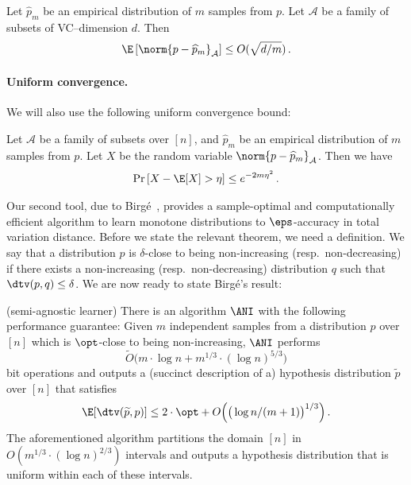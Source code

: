 \begin{theorem}
\label{thm:vc-inequality}
Let $\widehat{p}_m$ be an empirical distribution of $m$ samples from $p$.
Let $\mathcal A$ be a family of subsets of VC--dimension $d$.
Then
$$ \E \left [ \norm{p - \widehat{p}_m}_{\mathcal A} \right] \leq O(\sqrt{d/m}) \,.$$
\end{theorem}

\paragraph{Uniform convergence.}
We will also use the following uniform convergence bound:
%
\begin{theorem}[{\cite[p.17]{DL:01}}]
\label{thm:bdd-diff}
Let $\mathcal A$ be a family of subsets over $[n]$, and $\widehat{p}_m$ be an
empirical distribution of $m$ samples from $p$.
Let $X$ be the random variable $\norm{p - \widehat{p}_{m}}_{\mathcal A}$.
Then we have
$$ \Pr\left[ X - \E[X] > \eta \right] \leq e^{-2m\eta^2}\,.$$
\end{theorem}

Our second tool, due to Birg\'{e}~\cite{Birge:87b},
provides a sample-optimal and computationally efficient algorithm
to learn monotone distributions to $\eps$-accuracy in total variation distance.
Before we state the relevant theorem, we need a definition.
We say that a distribution $p$ is $\delta$-close to being non-increasing (resp.\ non-decreasing)
if there exists a non-increasing (resp.\ non-decreasing) distribution $q$ such that
$\dtv(p,q)\leq \delta$. We are now ready to state  Birg\'{e}'s result:


\begin{theorem} \label{thm:birge-monotone}
(semi-agnostic learner) \label{thm:agnostic-monotone-learner}
There is an algorithm $\ANI$ with the following performance guarantee: Given
$m$ independent samples from a distribution $p$  over $[n]$ which is $\opt$-close to being non-increasing,
$\ANI$ performs
\[
\tilde{O}\bigl( m \cdot \log n + m^{1/3} \cdot (\log n)^{5/3}\bigr)
\]
bit operations
and outputs a (succinct description of a) hypothesis distribution $\widetilde{p}$ over $[n]$ that satisfies
$$\E[\dtv(\widetilde{p},p)] \leq 2 \cdot \opt + O\Big(\big(\log n/(m+1)\big)^{1/3}\Big)\,.$$
The aforementioned algorithm partitions the domain $[n]$
in $O(m^{1/3} \cdot (\log n)^{2/3})$ intervals and outputs a hypothesis distribution
that is uniform within each of these intervals.
\end{theorem}

